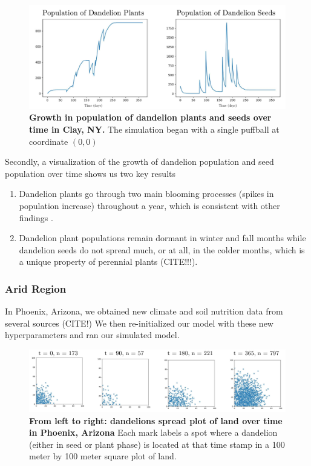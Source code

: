 \begin{figure}[h!]
\centering
    \includegraphics[scale=0.5]{figures/moderateclimatepopulation.pdf}
    \captionsetup{width=0.9\textwidth}
    \caption{\textbf{Growth in population of dandelion plants and seeds over time in Clay, NY.} The simulation began with a single puffball at coordinate \((0, 0)\)}
    \label{fig:temperatepopulation}
\end{figure}

Secondly, a visualization of the growth of dandelion population and seed population over time shows us two key results

\begin{enumerate}
    \item Dandelion plants go through two main blooming processes (spikes in population increase) throughout a year, which is consistent with other findings \cite{noauthor_dandelion_nodate-2}.
    \item Dandelion plant populations remain dormant in winter and fall months while dandelion seeds do not spread much, or at all, in the colder months, which is a unique property of perennial plants (CITE!!!).
\end{enumerate}

\subsubsection{Arid Region}

In Phoenix, Arizona, we obtained new climate and soil nutrition data from several sources (CITE!) We then re-initialized our model with these new hyperparameters and ran our simulated model.

\begin{figure}[h!]
\centering
    \includegraphics[scale=0.6]{figures/arizonaspread.pdf}
    \captionsetup{width=0.9\textwidth}
    \caption{\textbf{From left to right: dandelions spread plot of land over time in Phoenix, Arizona} Each mark labels a spot where a dandelion (either in seed or plant phase) is located at that time stamp in a 100 meter by 100 meter square plot of land.}
    \label{fig:arizonaspread}
\end{figure}

